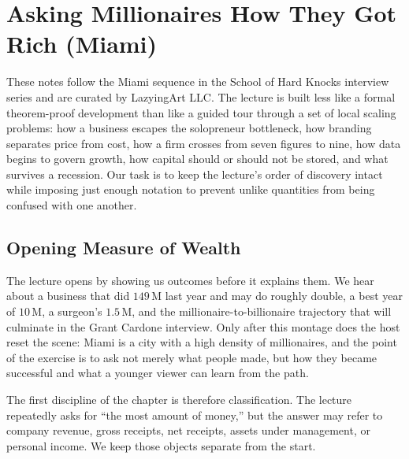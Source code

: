 \chapter{Asking Millionaires How They Got Rich (Miami)}

These notes follow the Miami sequence in the School of Hard Knocks interview series and are curated by LazyingArt LLC. The lecture is built less like a formal theorem-proof development than like a guided tour through a set of local scaling problems: how a business escapes the solopreneur bottleneck, how branding separates price from cost, how a firm crosses from seven figures to nine, how data begins to govern growth, how capital should or should not be stored, and what survives a recession. Our task is to keep the lecture's order of discovery intact while imposing just enough notation to prevent unlike quantities from being confused with one another.

\section{Opening Measure of Wealth}

The lecture opens by showing us outcomes before it explains them. We hear about a business that did \(149\,\mathrm{M}\) last year and may do roughly double, a best year of \(10\,\mathrm{M}\), a surgeon's \(1.5\,\mathrm{M}\), and the millionaire-to-billionaire trajectory that will culminate in the Grant Cardone interview. Only after this montage does the host reset the scene: Miami is a city with a high density of millionaires, and the point of the exercise is to ask not merely what people made, but how they became successful and what a younger viewer can learn from the path.

The first discipline of the chapter is therefore classification. The lecture repeatedly asks for ``the most amount of money,'' but the answer may refer to company revenue, gross receipts, net receipts, assets under management, or personal income. We keep those objects separate from the start.

